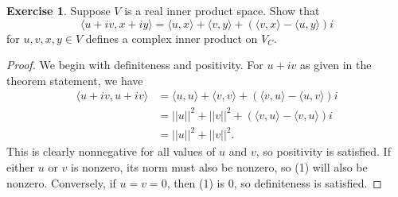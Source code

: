 \documentclass{article}
\theoremstyle{definition}
\newtheorem{ex}{Exercise}
\begin{document}
\begin{ex}
	Suppose $V$ is a real inner product space. Show that \begin{equation*}
		\langle u + iv, x + iy \rangle = \langle u, x \rangle + \langle v, y \rangle + \left( \langle v, x \rangle - \langle u, y \rangle \right)i
	\end{equation*} for $u, v, x, y \in V$ defines a complex inner product on $V_C$.
\end{ex}
\begin{proof}
	We begin with definiteness and positivity.
	For $u + iv$ as given in the theorem statement, we have \begin{align*}
		\langle u + iv, u + iv \rangle & = \langle u, u \rangle + \langle v, v \rangle + \left( \langle v, u \rangle - \langle u, v \rangle \right)i \\
		                               & = ||u||^2 + ||v||^2 + (\langle v, u \rangle - \langle v, u \rangle )i                                       \\
		                               & = ||u||^2 + ||v||^2. \tag{1}
	\end{align*}
	\setcounter{equation}{1}
	This is clearly nonnegative for all values of $u$ and $v$, so positivity is satisfied.
	If either $u$ or $v$ is nonzero, its norm must also be nonzero, so (1) will also be nonzero.
	Conversely, if $u = v = 0$, then (1) is 0, so definiteness is satisfied.


\end{proof}
\end{document}
